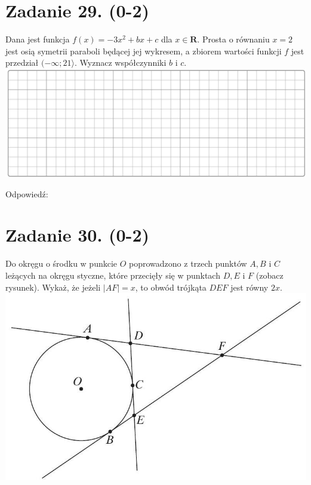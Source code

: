 \documentclass[10pt]{article}
\begin{document}
\section*{Zadanie 29. (0-2)}
Dana jest funkcja \(f(x)=-3 x^{2}+b x+c\) dla \(x \in \boldsymbol{R}\). Prosta o równaniu \(x=2\) jest osią symetrii paraboli będącej jej wykresem, a zbiorem wartości funkcji \(f\) jest przedział \((-\infty ; 21\rangle\). Wyznacz współczynniki \(b\) i \(c\).\\
\includegraphics[max width=\textwidth, center]{2024_11_21_724abc2cf5a71562f5b2g-12(1)}

Odpowiedź:

\section*{Zadanie 30. (0-2)}
Do okręgu o środku w punkcie \(O\) poprowadzono z trzech punktów \(A, B\) i \(C\) leżących na okręgu styczne, które przecięły się w punktach \(D, E\) i \(F\) (zobacz rysunek). Wykaż, że jeżeli \(|A F|=x\), to obwód trójkąta \(D E F\) jest równy \(2 x\).\\
\includegraphics[max width=\textwidth, center]{2024_11_21_724abc2cf5a71562f5b2g-12}
\end{document}
